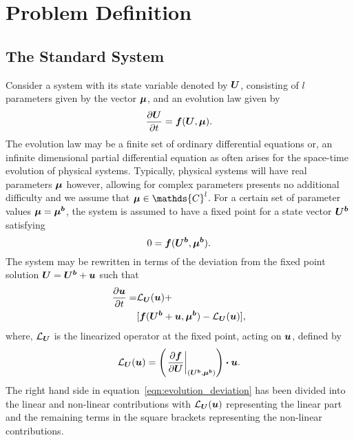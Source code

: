 \section{Problem Definition}
\label{sec:problem_setup}

\subsection{The Standard System}
\label{sec:standard}

Consider a system with its state variable denoted by $\boldsymbol{U}$, consisting of $l$ parameters given by the vector $\boldsymbol{\mu}$, and an evolution law given by 
\begin{equation}
	\frac{\partial \boldsymbol{U}}{\partial t} = \boldsymbol{f}(\boldsymbol{U},\boldsymbol{\mu}).
	\label{eqn:evolution0}
\end{equation}
The evolution law may be a finite set of ordinary differential equations or, an infinite dimensional partial differential equation as often arises for the space-time evolution of physical systems. Typically, physical systems will have real parameters $\boldsymbol{\mu}$ however, allowing for complex parameters presents no additional difficulty and we assume that $\vecmu \in \mathds{C}^{l}$. 
For a certain set of parameter values $\boldsymbol{\mu} = \boldsymbol{\mu^{b}}$, the system is assumed to have a fixed point for a state vector $\boldsymbol{U^{b}}$ satisfying
\begin{equation}
	0 = \boldsymbol{f}(\boldsymbol{U^{b}},\boldsymbol{\mu^{b}}).
	\label{eqn:fixed_point}
\end{equation}
The system may be rewritten in terms of the deviation from the fixed point solution $\boldsymbol{U} =  \boldsymbol{U^{b}} + \boldsymbol{u}$ such that 
\begin{equation}
	\begin{split}
		\frac{\partial \boldsymbol{u}}{\partial t} =& \mathcal{L}_{\boldsymbol{U}}(\boldsymbol{u}) + \\
		& [\boldsymbol{f}(\boldsymbol{U^{b}} + \boldsymbol{u},\boldsymbol{\mu^{b}}) - \mathcal{L}_{\boldsymbol{U}}(\boldsymbol{u})],
	\end{split}
	\label{eqn:evolution_deviation}
\end{equation}
where, $\mathcal{L}_{\boldsymbol{U}}$ is the linearized operator at the fixed point, acting on $\boldsymbol{u}$, defined by
\begin{equation}
	\mathcal{L}_{\boldsymbol{U}}(\boldsymbol{u}) = \left(\left.\frac{\partial \boldsymbol{f}}{\partial \boldsymbol{U}}\right|_{(\boldsymbol{U^{b}},\boldsymbol{\mu^{b}})} \right)\boldsymbol{\cdot} \boldsymbol{u}.
	\label{eqn:linearized_operator_u}
\end{equation}
The right hand side in equation~\eqref{eqn:evolution_deviation} has been divided into the linear and non-linear contributions with $\mathcal{L}_{\boldsymbol{U}}(\boldsymbol{u})$ representing the linear part and the remaining terms in the square brackets representing the non-linear contributions.

